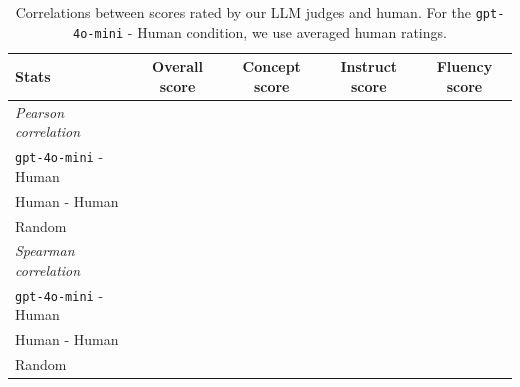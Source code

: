 \begin{table}[h!]
    \small
    \centering
    \begin{tabular}{lcccc}
    \toprule
    \textbf{Stats} & \textbf{Overall score} & Concept score & Instruct score & Fluency score \\
    \midrule
    \emph{Pearson correlation} & & & & \\
    \quad \texttt{gpt-4o-mini} - Human & & & & \\
    \quad Human - Human & & & & \\
    \quad Random & & & & \\ \midrule
    \emph{Spearman correlation} & & & & \\
    \quad \texttt{gpt-4o-mini} - Human & & & & \\
    \quad Human - Human & & & & \\
    \quad Random & & & & \\ 
    \bottomrule
    \end{tabular}
    \caption{Correlations between scores rated by our LLM judges and human. For the \texttt{gpt-4o-mini} - Human condition, we use averaged human ratings.}
\end{table}